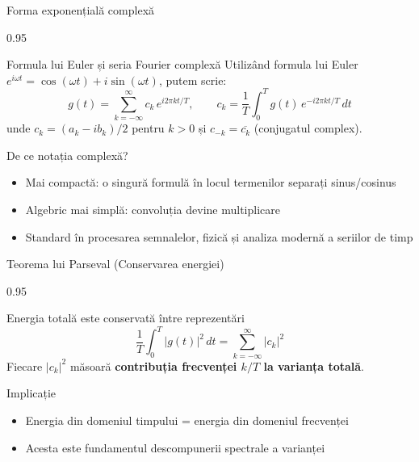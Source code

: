 \documentclass[9pt, aspectratio=169, t]{beamer}
\begin{document}
\begin{frame}{Forma exponențială complexă}
    \begin{cminipage}{0.95\textwidth}
    \vspace{-2mm}
    \begin{block}{Formula lui Euler și seria Fourier complexă}
        {\small Utilizând formula lui Euler $e^{i\omega t} = \cos(\omega t) + i\sin(\omega t)$, putem scrie:
        \[
            g(t) = \sum_{k=-\infty}^{\infty} c_k \, e^{i 2\pi k t / T}, \qquad c_k = \frac{1}{T}\int_0^T g(t)\, e^{-i 2\pi k t / T}\,dt
        \]
        unde $c_k = (a_k - ib_k)/2$ pentru $k > 0$ și $c_{-k} = \overline{c_k}$ (conjugatul complex).}
    \end{block}
    \vspace{-2mm}
    \begin{exampleblock}{De ce notația complexă?}
        \begin{itemize}\setlength{\itemsep}{0pt}
            \item Mai compactă: o singură formulă în locul termenilor separați sinus/cosinus
            \item Algebric mai simplă: convoluția devine multiplicare
            \item Standard în procesarea semnalelor, fizică și analiza modernă a seriilor de timp
        \end{itemize}
    \end{exampleblock}
    \end{cminipage}
\end{frame}

\begin{frame}{Teorema lui Parseval (Conservarea energiei)}
    \begin{cminipage}{0.95\textwidth}
    \vspace{-2mm}
    \begin{block}{Energia totală este conservată între reprezentări}
        {\small
        \[
            \frac{1}{T}\int_0^T |g(t)|^2\,dt = \sum_{k=-\infty}^{\infty} |c_k|^2
        \]
        Fiecare $|c_k|^2$ măsoară \textbf{contribuția frecvenței $k/T$ la varianța totală}.}
    \end{block}
    \vspace{-2mm}
    \begin{exampleblock}{Implicație}
        \begin{itemize}\setlength{\itemsep}{0pt}
            \item Energia din domeniul timpului = energia din domeniul frecvenței
            \item Acesta este fundamentul descompunerii spectrale a varianței
        \end{itemize}
    \end{exampleblock}
    \end{cminipage}
\end{frame}
\end{document}
